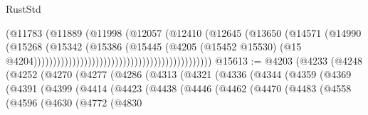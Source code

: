 \begin{lexlean}{RustStd}
\begin{coremodule}
                                                                  (@11783
                                                                    (@11889
                                                                      (@11998
                                                                        (@12057
                                                                          (@12410
                                                                            (@12645
                                                                              (@13650
                                                                                (@14571
                                                                                  (@14990
                                                                                    (@15268
                                                                                      (@15342
                                                                                        (@15386
                                                                                          (@15445
                                                                                            (@4205
                                                                                              (@15452
                                                                                                @15530)
                                                                                              (@15
                                                                                                @4204))))))))))))))))))))))))))))))))))))))))))))))
@15613 := @4203
    (@4233
      (@4248
        (@4252
          (@4270
            (@4277
              (@4286
                (@4313
                  (@4321
                    (@4336
                      (@4344
                        (@4359
                          (@4369
                            (@4391
                              (@4399
                                (@4414
                                  (@4423
                                    (@4438
                                      (@4446
                                        (@4462
                                          (@4470
                                            (@4483
                                              (@4558
                                                (@4596
                                                  (@4630
                                                    (@4772
                                                      (@4830

\end{coremodule}
\end{lexlean}
